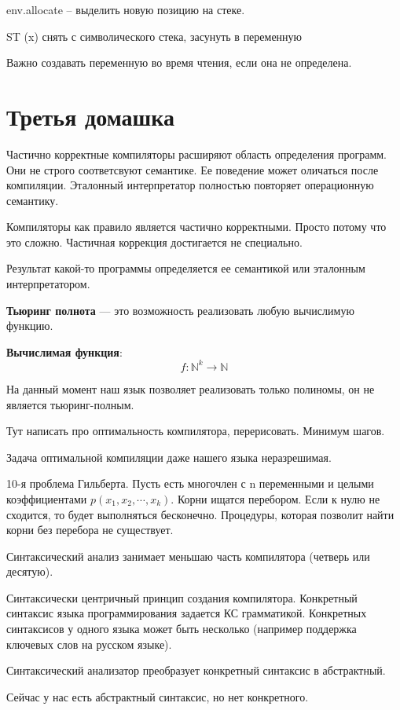 env.allocate -- выделить новую позицию на стеке.

ST (x) снять с символического стека, засунуть в переменную

Важно создавать переменную во время чтения, если она не определена. 

\section{Третья домашка}

Частично корректные компиляторы расширяют область определения программ. Они не
строго соответсвуют семантике. Ее поведение может оличаться после компиляции.
Эталонный интерпретатор полностью повторяет операционную семантику.

Компиляторы как правило является частично корректными. Просто потому что это
сложно. Частичная коррекция достигается не специально.

Результат какой-то программы определяется ее семантикой или эталонным
интерпретатором.

\textbf{Тьюринг полнота} --- это возможность реализовать любую вычислимую функцию.

\textbf{Вычислимая функция}:
\[
    f: \mathbb{N}^k \to \mathbb{N}
\]

На данный момент наш язык позволяет реализовать только полиномы, он не является
тьюринг-полным.

Тут написать про оптимальность компилятора, перерисовать. Минимум шагов.

Задача оптимальной компиляции даже нашего языка неразрешимая. 

10-я проблема Гильберта. Пусть есть многочлен с n переменными и целыми
коэффициентами $p(x_1, x_2, \cdots, x_k)$. Корни ищатся перебором. Если к нулю
не сходится, то будет выполняться бесконечно. Процедуры, которая позволит найти
корни без перебора не существует.

Синтаксический анализ занимает меньшаю часть компилятора (четверь или десятую).

Синтаксически центричный принцип создания компилятора. Конкретный синтаксис языка
программирования задается КС грамматикой. Конкретных синтаксисов у одного языка
может быть несколько (например поддержка ключевых слов на русском языке).

Синтаксический анализатор преобразует конкретный синтаксис в абстрактный.

Сейчас у нас есть абстрактный синтаксис, но нет конкретного.

